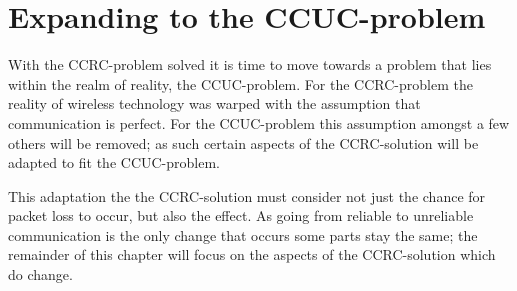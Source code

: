 \chapter{Expanding to the CCUC-problem}\label{CCUC}
With the CCRC-problem solved it is time to move towards a problem that lies within the realm of reality, the CCUC-problem.
For the CCRC-problem the reality of wireless technology was warped with the assumption that communication is perfect.
For the CCUC-problem this assumption amongst a few others will be removed; as such certain aspects of the CCRC-solution will be adapted to fit the CCUC-problem.

This adaptation the the CCRC-solution must consider not just the chance for packet loss to occur, but also the effect.
As going from reliable to unreliable communication is the only change that occurs some parts stay the same; the remainder of this chapter will focus on the aspects of the CCRC-solution which do change.







